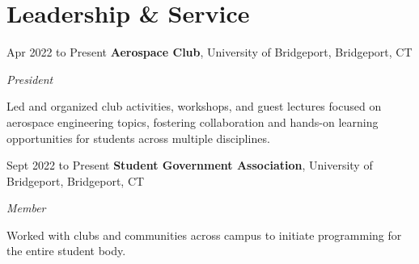 \section{Leadership \& Service} 
    \begin{twocolentry}{Apr 2022 to Present}
        \textbf{Aerospace Club}, University of Bridgeport, Bridgeport, CT
    \end{twocolentry}
    \textit{President}
    \vspace{0.10 cm}
    \begin{onecolentry}
        \begin{highlights}
            \item Led and organized club activities, workshops, and guest lectures focused on aerospace engineering topics, fostering collaboration and hands-on learning opportunities for students across multiple disciplines.
        \end{highlights}
    \end{onecolentry}

    \vspace{0.10 cm}

    \begin{twocolentry}{Sept 2022 to Present}
        \textbf{Student Government Association}, University of Bridgeport, Bridgeport, CT
    \end{twocolentry}
    \textit{Member}
    \vspace{0.10 cm}
    \begin{onecolentry}
        \begin{highlights}
            \item Worked with clubs and communities across campus to initiate programming for the entire student body.
        \end{highlights}
    \end{onecolentry}